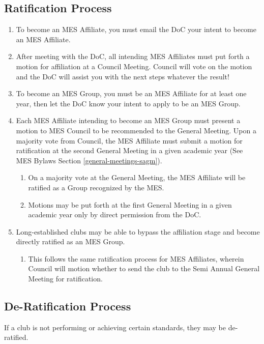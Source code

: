 \subsection{Ratification Process}
\label{ratification-process}
\begin{enumerate}
 \item
  To become an MES Affiliate, you must email the DoC your intent to become an MES Affiliate.
 \item
  After meeting with the DoC, all intending MES Affiliates must put forth a motion for affiliation at a Council Meeting. Council will vote on the motion and the DoC will assist you with the next steps whatever the result!
 \item
  To become an MES Group, you must be an MES Affiliate for at least one year, then let the DoC know your intent to apply to be an MES Group.
 \item
  Each MES Affiliate intending to become an MES Group must present a motion to MES Council to be recommended to the General Meeting. Upon a majority vote from Council, the MES Affiliate must submit a motion for ratification at the second General Meeting in a given academic year (See MES Bylaws Section \ref{general-meetings-sagm}).

  \begin{enumerate}
   \item
    On a majority vote at the General Meeting, the MES Affiliate will be ratified as a Group recognized by the MES.
   \item
    Motions may be put forth at the first General Meeting in a given academic year only by direct permission from the DoC.
  \end{enumerate}
 \item
  Long-established clubs may be able to bypass the affiliation stage and become directly ratified as an MES Group.

  \begin{enumerate}
   \item
    This follows the same ratification process for MES Affiliates, wherein Council will motion whether to send the club to the Semi Annual General Meeting for ratification.
  \end{enumerate}

\end{enumerate}

\subsection{De-Ratification Process}
\label{de-ratification-process}
If a club is not performing or achieving certain standards, they may be
de-ratified.

